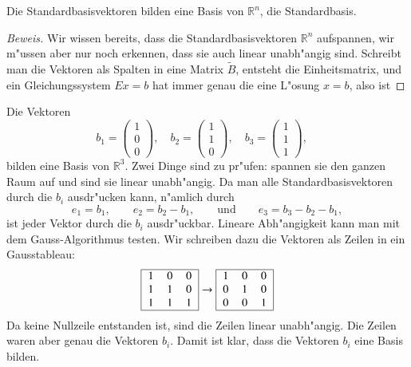 \begin{satz}
Die Standardbasisvektoren bilden eine Basis von $\mathbb R^n$,
die Standardbasis.
\end{satz}

\begin{proof}[Beweis]
Wir wissen bereits, dass die Standardbasisvektoren $\mathbb R^n$ aufspannen,
wir m"ussen aber nur noch erkennen, dass sie auch linear unabh"angig sind.
Schreibt man die Vektoren als Spalten in eine Matrix $\tilde B$, entsteht die
Einheitsmatrix, und ein Gleichungssystem $Ex=b$ hat immer genau die eine
L"osung $x=b$, also ist 
\end{proof}

\begin{beispiel}
Die Vektoren 
\[
b_1=\begin{pmatrix}1\\0\\0\end{pmatrix},\quad
b_2=\begin{pmatrix}1\\1\\0\end{pmatrix},\quad
b_3=\begin{pmatrix}1\\1\\1\end{pmatrix},\quad
\]
bilden eine Basis von $\mathbb R^3$.
Zwei Dinge sind zu pr"ufen:
spannen sie den ganzen Raum auf und sind sie linear unabh"angig.
Da man alle Standardbasisvektoren durch die $b_i$ ausdr"ucken kann, n"amlich
durch
\[
e_1=b_1,\qquad e_2=b_2-b_1,\qquad\text{und}\qquad e_3=b_3-b_2-b_1,
\]
ist jeder Vektor durch die $b_i$ ausdr"uckbar.
Lineare Abh"angigkeit kann
man mit dem Gauss-Algorithmus testen.
Wir schreiben dazu die Vektoren
als Zeilen in ein Gausstableau:
\[
\begin{tabular}{|>{$}c<{$}>{$}c<{$}>{$}c<{$}|}
\hline
1&0&0\\
1&1&0\\
1&1&1\\
\hline
\end{tabular}
\rightarrow
\begin{tabular}{|>{$}c<{$}>{$}c<{$}>{$}c<{$}|}
\hline
1&0&0\\
0&1&0\\
0&0&1\\
\hline
\end{tabular}
\]
Da keine Nullzeile entstanden ist, sind die Zeilen linear unabh"angig.
Die Zeilen waren aber genau die Vektoren $b_i$.
Damit ist klar, dass
die Vektoren $b_i$ eine Basis bilden.
\end{beispiel}

